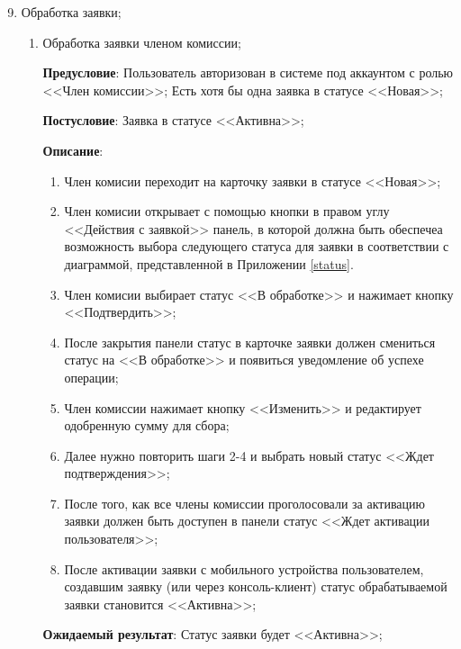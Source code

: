 \renewcommand{\labelenumi}{\textbf{TC-\arabic{enumi}}.}

\renewcommand{\labelenumii}{\textbf{TC-\arabic{enumi}.\arabic{enumii}}.}


\begin{enumerate}
    \setcounter{enumi}{8}
    \item Обработка заявки;
    
    \begin{enumerate}
        \item Обработка заявки членом комиссии;
        
        \textbf{Предусловие}: Пользователь авторизован в системе под аккаунтом с ролью <<Член комиссии>>; Есть хотя бы одна заявка в статусе <<Новая>>;  
        
        \textbf{Постусловие}: Заявка в статусе <<Активна>>;
        
        \textbf{Описание}: \begin{enumerate}
            \item Член комисии переходит на карточку заявки в статусе <<Новая>>;
            \item Член комисии открывает с помощью кнопки в правом углу <<Действия с заявкой>> панель, в которой должна быть обеспечеа возможность выбора следующего статуса для заявки в соответствии с диаграммой, представленной в Приложении \ref{status}.
            \item Член комисии выбирает статус <<В обработке>> и нажимает кнопку <<Подтвердить>>; 
            \item После закрытия панели статус в карточке заявки должен смениться статус на <<В обработке>> и появиться уведомление об успехе операции;
            \item Член комиссии нажимает кнопку <<Изменить>> и редактирует одобренную сумму для сбора;
            \item Далее нужно повторить шаги 2-4 и выбрать новый статус <<Ждет подтверждения>>;
            \item После того, как все члены комиссии проголосовали за активацию заявки должен быть доступен в панели статус <<Ждет активации пользователя>>;
            \item После активации заявки с мобильного устройства пользователем, создавшим заявку (или через консоль-клиент) статус обрабатываемой заявки становится <<Активна>>;
        \end{enumerate}
        
        \textbf{Ожидаемый результат}: Статус заявки будет <<Активна>>;
        

\end{enumerate}
\end{enumerate}
